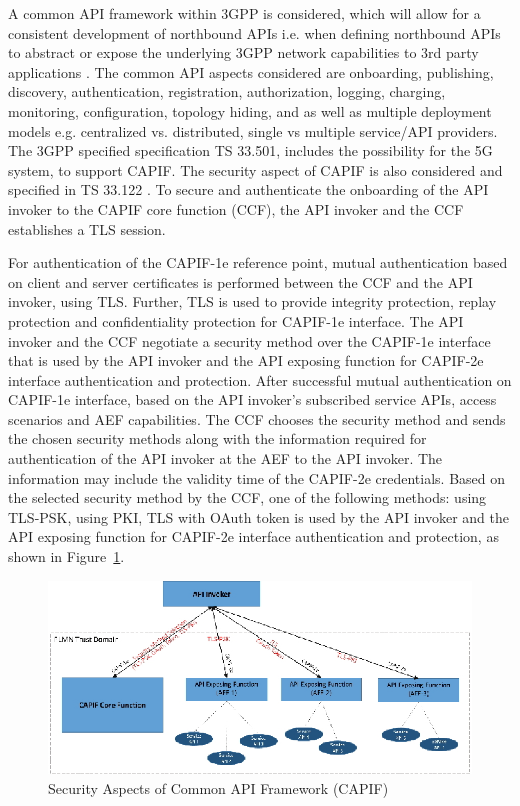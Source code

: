 \begin{multicols}{2}
A common API framework within 3GPP is considered, which will allow for a consistent development of northbound APIs i.e. when defining northbound APIs to abstract or expose the underlying 3GPP network capabilities to 3rd party applications \cite{art4-key10}. The common API  aspects considered are onboarding, publishing, discovery, authentication, registration, authorization, logging, charging, monitoring, configuration, topology hiding, and as well as multiple deployment models e.g. centralized vs. distributed, single vs multiple service/API providers. The 3GPP specified specification TS 33.501\cite{art4-key03}, includes the possibility for the 5G system, to support CAPIF. The security aspect of CAPIF is also considered and specified in TS 33.122 \cite{art4-key04}. To secure and authenticate the onboarding of the API invoker to the CAPIF core function (CCF), the API invoker and the CCF establishes a TLS session. 

For authentication of the CAPIF-1e reference point, mutual authentication based on client and server certificates is performed between the CCF and the API invoker, using TLS. Further, TLS is used to provide integrity protection, replay protection and confidentiality protection for CAPIF-1e interface. The API invoker and the CCF negotiate a security method over the CAPIF-1e interface that is used by the API invoker and the API exposing function for CAPIF-2e interface authentication and protection. After successful mutual authentication on CAPIF-1e interface, based on the API invoker's subscribed service APIs, access scenarios and AEF capabilities. The CCF chooses the security method and sends the chosen security methods along with the information required for authentication of the API invoker at the AEF to the API invoker. The information may include the validity time of the CAPIF-2e credentials. Based on the selected security method by the CCF, one of the following methods: using TLS-PSK, using PKI, TLS with OAuth token is used by the API invoker and the API exposing function for CAPIF-2e interface authentication and protection, as shown in Figure~\ref{chap4-fig09}.
\begin{figure}[H]
\centering
\includegraphics[scale=1.3]{src/Figures/chap4/chap4-fig09.jpg}
\caption{Security Aspects of Common API Framework (CAPIF)}\label{chap4-fig09}
\end{figure}


\end{multicols}
